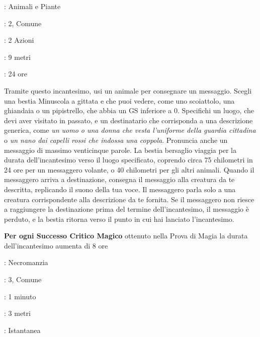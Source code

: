 \begin{multicols}{2}
\label{Animal Messenger}
\noindent\colorbox{OBSSgold!10}{
\begin{minipage}{0.95\linewidth}
\begin{description}[noitemsep, topsep=0pt, parsep=0pt, partopsep=0pt, leftmargin=0cm, labelwidth=1.3cm]
\item[\textbf{Lista}]: Animali e Piante
\item[\textbf{Livello}]: 2, Comune
\item[\textbf{Lancio}]: 2 Azioni
\item[\textbf{Gittata}]: 9 metri
\item[\textbf{Durata}]: 24 ore
\end{description}
\end{minipage}}\smallskip

Tramite questo incantesimo, usi un animale per consegnare un messaggio. Scegli una bestia Minuscola a gittata e che puoi vedere, come uno scoiattolo, una ghiandaia o un pipistrello, che abbia un GS inferiore a 0. Specifichi un luogo, che devi aver visitato in passato, e un destinatario che corrisponda a una descrizione generica, come \emph{un uomo o una donna che vesta l'uniforme della guardia cittadina} o \emph{un nano dai capelli rossi che indossa una coppola}. Pronuncia anche un messaggio di massimo venticinque parole. La bestia bersaglio viaggia per la durata dell'incantesimo verso il luogo specificato, coprendo circa 75 chilometri in 24 ore per un messaggero volante, o 40 chilometri per gli altri animali. Quando il messaggero arriva a destinazione, consegna il messaggio alla creatura da te descritta, replicando il suono della tua voce. Il messaggero parla solo a una creatura corrispondente alla descrizione da te fornita. Se il messaggero non riesce a raggiungere la destinazione prima del termine dell'incantesimo, il messaggio è perduto, e la bestia ritorna verso il punto in cui hai lanciato l'incantesimo.

\textbf{Per ogni Successo Critico Magico} ottenuto nella Prova di Magia la durata dell'incantesimo aumenta di 8 ore

\noindent\colorbox{OBSSgold!10}{
\begin{minipage}{0.95\linewidth}
\begin{description}[noitemsep, topsep=0pt, parsep=0pt, partopsep=0pt, leftmargin=0cm, labelwidth=1.3cm]
\item[\textbf{Lista}]: Necromanzia
\item[\textbf{Livello}]: 3, Comune
\item[\textbf{Lancio}]: 1 minuto
\item[\textbf{Gittata}]: 3 metri
\item[\textbf{Durata}]: Istantanea
\end{description}
\end{minipage}}\smallskip


\end{multicols}
